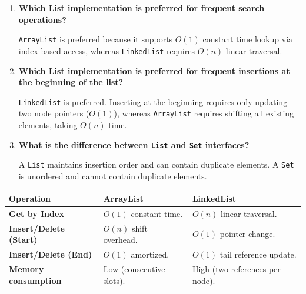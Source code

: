 \documentclass[12pt,a4paper]{article}
\newcommand{\Q}[1]{\textbf{#1}\par\noindent\ignorespaces}
\renewcommand{\arraystretch}{1.45}
\begin{document}
\begin{tcolorbox}[exambox, title={\textbf{Frequently Asked / Viva Questions}}]
\begin{enumerate}[leftmargin=*, label=\textbf{Q\arabic*.}, itemsep=5pt]
  \item \Q{Which List implementation is preferred for frequent search operations?}
        \texttt{ArrayList} is preferred because it supports $O(1)$ constant time lookup via index-based access, whereas \texttt{LinkedList} requires $O(n)$ linear traversal.
        
  \item \Q{Which List implementation is preferred for frequent insertions at the beginning of the list?}
        \texttt{LinkedList} is preferred. Inserting at the beginning requires only updating two node pointers ($O(1)$), whereas \texttt{ArrayList} requires shifting all existing elements, taking $O(n)$ time.
        
  \item \Q{What is the difference between \texttt{List} and \texttt{Set} interfaces?}
        A \texttt{List} maintains insertion order and can contain duplicate elements. A \texttt{Set} is unordered and cannot contain duplicate elements.
\end{enumerate}
\end{tcolorbox}

\begin{tcolorbox}[tikzbox, title={ArrayList vs. LinkedList operations complexity}]
\centering
{\renewcommand{\arraystretch}{1.45}%
\begin{tabularx}{\linewidth}{|B{3.2cm}|Y|Y|}
\hline
\textbf{Operation} & \textbf{ArrayList} & \textbf{LinkedList} \\
\hline
\textbf{Get by Index} & $O(1)$ constant time. & $O(n)$ linear traversal. \\
\hline
\textbf{Insert/Delete (Start)} & $O(n)$ shift overhead. & $O(1)$ pointer change. \\
\hline
\textbf{Insert/Delete (End)} & $O(1)$ amortized. & $O(1)$ tail reference update. \\
\hline
\textbf{Memory consumption} & Low (consecutive slots). & High (two references per node). \\
\hline
\end{tabularx}}
\\
\end{tcolorbox}
\end{document}
